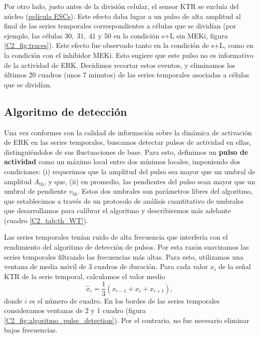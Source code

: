\documentclass[./main.tex]{subfiles}
\begin{document}
Por otro lado, justo antes de la división celular, el sensor KTR se excluía del núcleo (\href{http://movie.biologists.com/video/10.1242/dev.199710/video-1}{\underline{película ESCs}}). Este efecto daba lugar a un pulso de alta amplitud al final de las series temporales correspondientes a células que se dividían (por ejemplo, las células $30,\; 31,\; 41$ y $50$ en la condición s+L sin MEKi, figura \ref{C2_fig:traces}). Este efecto fue observado tanto en la condición de s+L, como en la condición con el inhibidor MEKi. Esto sugiere que este pulso no es informativo de la actividad de ERK. Decidimos recortar estos eventos, y eliminamos los últimos $20$ cuadros (unos $7$ minutos) de las series temporales asociadas a células que se dividían. 


\subsection{Algoritmo de detección}
\label{C2_ssec:algoritmo}

Una vez conformes con la calidad de información sobre la dinámica de activación de ERK en las series temporales, buscamos detectar pulsos de actividad en ellas, distinguiéndolos de sus fluctuaciones de base. Para esto, definimos un \textbf{pulso de actividad} como un máximo local entre dos mínimos locales, imponiendo dos condiciones: (i) requerimos que la amplitud del pulso sea mayor que un umbral de amplitud $A_{\text{th}}$, y que, (ii) en promedio, las pendientes del pulso sean mayor que un umbral de pendiente $v_{\text{th}}$. Estos dos umbrales son parámetros libres del algoritmo, que establecimos a través de un protocolo de análisis cuantitativo de umbrales que desarrollamos para calibrar el algoritmo y describiremos más adelante (cuadro \ref{C2_tab:th_WT}). 


Las series temporales tenían ruido de alta frecuencia que interfería con el rendimiento del algoritmo de detección de pulsos. Por esta razón suavizamos las series temporales filtrando las frecuencias más altas. Para esto, utilizamos una ventana de media móvil de $3$ cuadros de duración. Para cada valor $x_i$ de la señal KTR de la serie temporal, calculamos el valor medio 
\begin{equation}
    \hat{x}_i = \frac{1}{3} ( x_{i-1} + x_{i} + x_{i+1} ) ,
\end{equation}
donde $i$ es el número de cuadro. En los bordes de las series temporales consideramos ventanas de $2$ y $1$ cuadro (figura \ref{C2_fig:algoritmo_pulse_detection}). Por el contrario, no fue necesario eliminar bajas frecuencias. 
\end{document}
